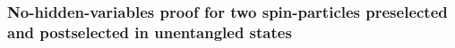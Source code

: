 \documentclass[%
  twocolumn,
 showpacs,
 showkeys,
 preprintnumbers,
 amsmath,amssymb,
 aps,
  pra,
  longbibliography,
 floatfix,
 ]{revtex4-1}
\begin{document}

\subsubsection{No-hidden-variables proof for two spin-particles preselected and postselected in unentangled states}

\cite{Cab97}
\end{document}
